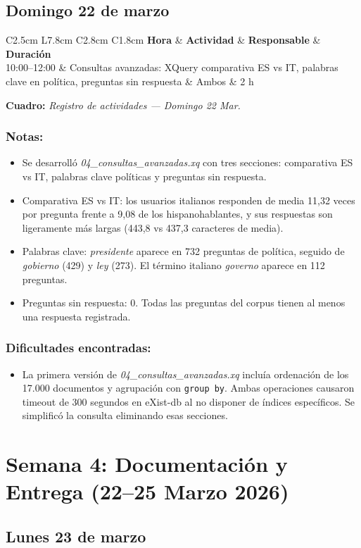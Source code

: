 \documentclass[11pt,a4paper]{article}
\newcommand{\notetitle}[1]{\subsubsection*{#1}}
\newcommand{\activitytable}[2]{%
  \begin{center}
  \begin{tabular}{C{2.5cm} L{7.8cm} C{2.8cm} C{1.8cm}}
  \toprule
  \rowcolor{white}
  \textbf{Hora} & \textbf{Actividad} & \textbf{Responsable} & \textbf{Duración} \\
  \midrule
  #1
  \bottomrule
  \end{tabular}
  \end{center}
  \vspace{-4pt}
  {\small\textbf{Cuadro:} \textit{#2}}
  \vspace{6pt}
}
\begin{document}
\subsection{Domingo 22 de marzo}

\activitytable{%
  10:00--12:00 & Consultas avanzadas: XQuery comparativa ES vs IT, palabras clave en política, preguntas sin respuesta & Ambos & 2 h \\
}{Registro de actividades --- Domingo 22 Mar.}

\notetitle{Notas:}
\begin{itemize}
  \item Se desarrolló \textit{04\_consultas\_avanzadas.xq} con tres secciones: comparativa ES vs IT, palabras clave políticas y preguntas sin respuesta.
  \item Comparativa ES vs IT: los usuarios italianos responden de media 11,32 veces por pregunta frente a 9,08 de los hispanohablantes, y sus respuestas son ligeramente más largas (443,8 vs 437,3 caracteres de media).
  \item Palabras clave: \textit{presidente} aparece en 732 preguntas de política, seguido de \textit{gobierno} (429) y \textit{ley} (273). El término italiano \textit{governo} aparece en 112 preguntas.
  \item Preguntas sin respuesta: 0. Todas las preguntas del corpus tienen al menos una respuesta registrada.
\end{itemize}

\notetitle{Dificultades encontradas:}
\begin{itemize}
  \item La primera versión de \textit{04\_consultas\_avanzadas.xq} incluía ordenación de los 17.000 documentos y agrupación con \texttt{group by}. Ambas operaciones causaron timeout de 300 segundos en eXist-db al no disponer de índices específicos. Se simplificó la consulta eliminando esas secciones.
\end{itemize}

\newpage

\section{Semana 4: Documentación y Entrega (22--25 Marzo 2026)}

\subsection{Lunes 23 de marzo}
\end{document}
